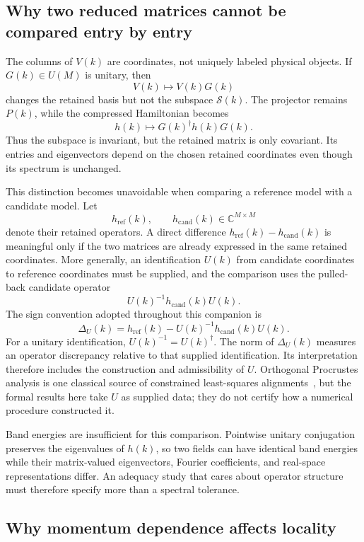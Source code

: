\subsection{Why two reduced matrices cannot be compared entry by entry}

The columns of $V(k)$ are coordinates, not uniquely labeled physical objects. If
$G(k)\in U(M)$ is unitary, then
\[
  V(k)\longmapsto V(k)G(k)
\]
changes the retained basis but not the subspace $\mathcal S(k)$. The projector remains
$P(k)$, while the compressed Hamiltonian becomes
\[
  h(k)\longmapsto G(k)^\dagger h(k)G(k).
\]
Thus the subspace is invariant, but the retained matrix is only covariant. Its entries
and eigenvectors depend on the chosen retained coordinates even though its spectrum is
unchanged.

This distinction becomes unavoidable when comparing a reference model with a candidate
model. Let
\[
  h_{\mathrm{ref}}(k),\qquad h_{\mathrm{cand}}(k)
  \in\mathbb C^{M\times M}
\]
denote their retained operators. A direct difference
$h_{\mathrm{ref}}(k)-h_{\mathrm{cand}}(k)$ is meaningful only if the two matrices are
already expressed in the same retained coordinates. More generally, an identification
$U(k)$ from candidate coordinates to reference coordinates must be supplied, and the
comparison uses the pulled-back candidate operator
\[
  U(k)^{-1}h_{\mathrm{cand}}(k)U(k).
\]
The sign convention adopted throughout this companion is
\[
  \Delta_U(k)
  =h_{\mathrm{ref}}(k)
   -U(k)^{-1}h_{\mathrm{cand}}(k)U(k).
\]
For a unitary identification, $U(k)^{-1}=U(k)^\dagger$. The norm of $\Delta_U(k)$
measures an operator discrepancy relative to that supplied identification. Its
interpretation therefore includes the construction and admissibility of $U$.
Orthogonal Procrustes analysis is one classical source of constrained least-squares
alignments~\cite{Schonemann1966}, but the formal results here take $U$ as supplied data;
they do not certify how a numerical procedure constructed it.

Band energies are insufficient for this comparison. Pointwise unitary conjugation preserves
the eigenvalues of $h(k)$, so two fields can have identical band energies while their
matrix-valued eigenvectors, Fourier coefficients, and real-space representations differ.
An adequacy study that cares about operator structure must therefore specify more than a
spectral tolerance.

\subsection{Why momentum dependence affects locality}

